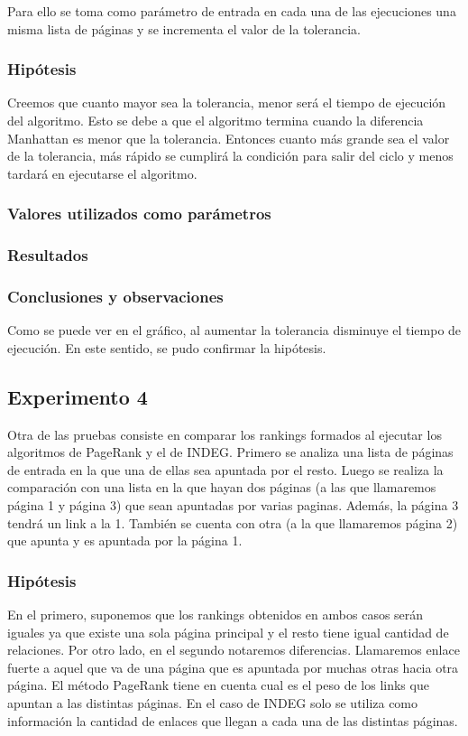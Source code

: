 	Para ello se toma como parámetro de entrada en cada una de las ejecuciones una misma lista de páginas y se incrementa el valor de la tolerancia.

		\subsubsection*{Hipótesis} 
		Creemos que cuanto mayor sea la tolerancia, menor será el tiempo de ejecución del algoritmo. Esto se debe a que el algoritmo termina cuando la diferencia Manhattan es menor que la tolerancia. Entonces cuanto más grande sea el valor de la tolerancia, más rápido se cumplirá la condición para salir del ciclo y menos tardará en ejecutarse el algoritmo. 

		\subsubsection*{Valores utilizados como parámetros} 		

		\subsubsection*{Resultados}

		\subsubsection*{Conclusiones y observaciones}
		Como se puede ver en el gráfico, al aumentar la tolerancia disminuye el tiempo de ejecución. En este sentido, se pudo confirmar la hipótesis.  

	

	\subsection{Experimento 4}
	Otra de las pruebas consiste en comparar los rankings formados al ejecutar los algoritmos de PageRank y el de INDEG. Primero se analiza una lista de páginas de entrada en la que una de ellas sea apuntada por el resto. Luego se realiza la comparación con una lista en la que hayan dos páginas (a las que llamaremos página 1 y página 3) que sean apuntadas por varias paginas. Además, la página 3 tendrá un link a la 1. También se cuenta con otra (a la que llamaremos página 2) que apunta y es apuntada por la página 1.

		\subsubsection*{Hipótesis} 
		En el primero, suponemos que los rankings obtenidos en ambos casos serán iguales ya que existe una sola página principal y el resto tiene igual cantidad de relaciones. Por otro lado, en el segundo notaremos diferencias. Llamaremos enlace fuerte a aquel que va de una página que es apuntada por muchas otras hacia otra página. El método PageRank tiene en cuenta cual es el peso de los links que apuntan a las distintas páginas. En el caso de INDEG solo se utiliza como información la cantidad de enlaces que llegan a cada una de las distintas páginas.

